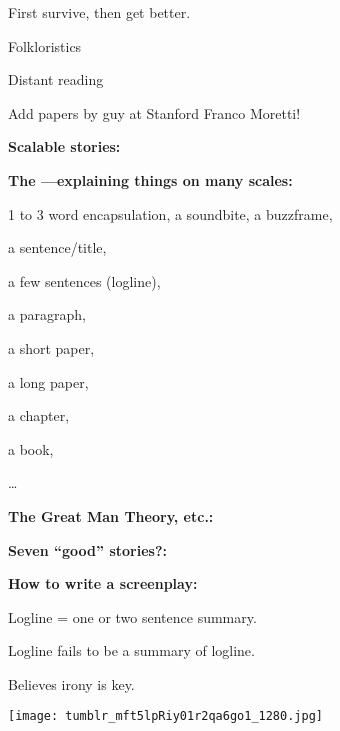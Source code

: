 First survive, then get better.


Folkloristics
\cite{abello2012a}

Distant reading

Add papers by guy at Stanford
Franco Moretti!


  \textbf{Scalable stories:}

  \textbf{The ---explaining things on many scales:}
    
     
      1 to 3 word encapsulation, a soundbite, a buzzframe,
     
      a sentence/title,
     
      a few sentences (logline),
     
      a paragraph,
     
      a short paper,
     
      a long paper,
     
      a chapter,
     
      a book,
     
      \ldots
    
  


  \textbf{The Great Man Theory, etc.:}

  \bigskip



  \textbf{Seven ``good'' stories?:}


  \textbf{How to write a screenplay:}


  
   
    Logline = one or two sentence summary.
   
    Logline fails to be a summary of logline.
   
    Believes irony is key.
  


  
  \begin{center}
    \texttt{[image: tumblr\_mft5lpRiy01r2qa6go1\_1280.jpg]}
  \end{center}

